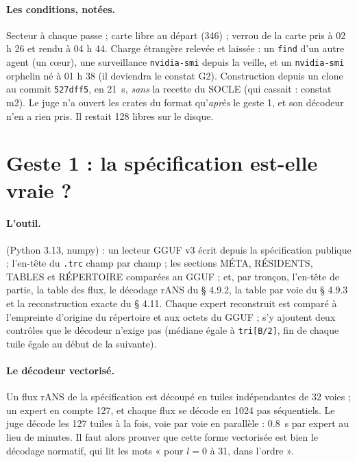 \paragraph{Les conditions, notées.} Secteur à chaque passe ; carte libre au départ (\SI{346}{\Mio}) ; verrou de la carte pris à 02 h 26 et rendu à 04 h 44. Charge étrangère relevée et laissée : un \texttt{find} d'un autre agent (un cœur), une surveillance \texttt{nvidia-smi} depuis la veille, et un \texttt{nvidia-smi} orphelin né à 01 h 38 (il deviendra le constat G2). Construction depuis un clone au commit \texttt{527dff5}, en \SI{21}{\second}, \emph{sans} la recette du SOCLE (qui cassait : constat m2). Le juge n'a ouvert les crates du format qu'\emph{après} le geste 1, et son décodeur n'en a rien pris. Il restait \SI{128}{\Go} libres sur le disque.

\section{Geste 1 : la spécification est-elle vraie ?}\label{t2e-sec:geste1}

\paragraph{L'outil.}  (Python 3.13, numpy) : un lecteur GGUF v3 écrit depuis la spécification publique ; l'en-tête du \texttt{.trc} champ par champ ; les sections MÉTA, RÉSIDENTS, TABLES et RÉPERTOIRE comparées au GGUF ; et, par tronçon, l'en-tête de partie, la table des flux, le décodage rANS du § 4.9.2, la table par voie du § 4.9.3 et la reconstruction exacte du § 4.11. Chaque expert reconstruit est comparé à l'empreinte d'origine du répertoire et aux octets du GGUF ; s'y ajoutent deux contrôles que le décodeur n'exige pas (médiane égale à \texttt{tri[B/2]}, fin de chaque tuile égale au début de la suivante).

\paragraph{Le décodeur vectorisé.} Un flux rANS de la spécification est découpé en tuiles indépendantes de 32 voies ; un expert en compte 127, et chaque flux se décode en \num{1024} pas séquentiels. Le juge décode les 127 tuiles à la fois, voie par voie en parallèle : \SI{0.8}{\second} par expert au lieu de minutes. Il faut alors prouver que cette forme vectorisée est bien le décodage normatif, qui lit les mots « pour $l = 0$ à 31, dans l'ordre ».

